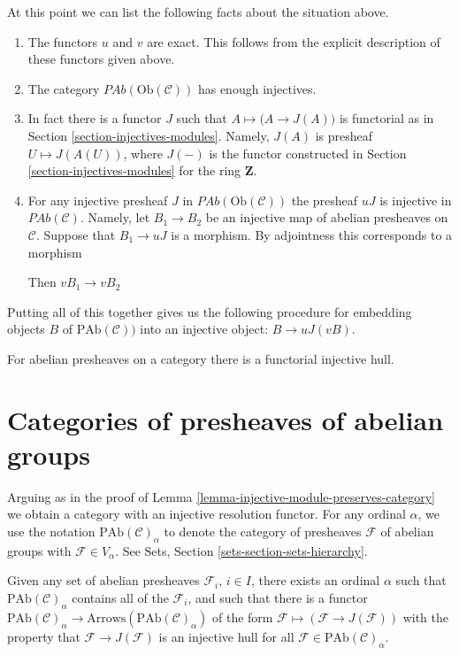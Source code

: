 \medskip\noindent
At this point we can list the following facts
about the situation above.
\begin{enumerate}
\item The functors $u$ and $v$ are exact. This follows from
the explicit description of these functors given above.
\item The category $\textit{PAb}(\text{Ob}(\mathcal{C}))$
has enough injectives.
\item In fact there is a functor $J$ such that
$A \mapsto \big(A \to J(A)\big)$ is functorial as in
Section \ref{section-injectives-modules}.
Namely, $J(A)$ is presheaf $U\mapsto J(A(U))$, where
$J(-)$ is the functor constructed in
Section \ref{section-injectives-modules} for the ring $\mathbf{Z}$.
\item For any injective presheaf $J$ in $\textit{PAb}(\text{Ob}(\mathcal{C}))$
the presheaf $uJ$ is injective in $\textit{PAb}(\mathcal{C})$.
Namely, let $B_1 \to B_2$ be an injective map of abelian
presheaves on $\mathcal{C}$. Suppose that $B_1 \to uJ$ is
a morphism. By adjointness this corresponds to a morphism

Then $vB_1 \to vB_2$
\end{enumerate}

\medskip\noindent
Putting all of this together gives us the following procedure
for embedding objects $B$ of $\text{PAb}(\mathcal{C}))$ into
an injective object: $B \to uJ(vB)$.

\begin{proposition}
\label{proposition-presheaves-injectives}
For abelian presheaves on a category there is a functorial injective hull.
\end{proposition}

\section{Categories of presheaves of abelian groups}
\label{section-category-presheaves}

\noindent
Arguing as in the proof of
Lemma \ref{lemma-injective-module-preserves-category} we obtain a category
with an injective resolution functor. For any ordinal $\alpha$,
we use the notation $\text{PAb}(\mathcal{C})_\alpha$ to denote the category
of presheaves $\mathcal{F}$ of abelian groups with $\mathcal{F} \in V_\alpha$.
See Sets, Section \ref{sets-section-sets-hierarchy}.

\begin{lemma} 
\label{lemma-injective-presheaf-preserves-category}
Given any set of abelian presheaves $\mathcal{F}_i$, $i\in I$, there
exists an ordinal $\alpha$ such that $\text{PAb}(\mathcal{C})_\alpha$
contains all of the $\mathcal{F}_i$, and such that there is a functor
$\text{PAb}(\mathcal{C})_\alpha \to
\text{Arrows}(\text{PAb}(\mathcal{C})_\alpha)$
of the form $\mathcal{F} \mapsto (\mathcal{F} \to J(\mathcal{F}))$
with the property that $\mathcal{F} \to J(\mathcal{F})$ is an injective
hull for all $\mathcal{F} \in \text{PAb}(\mathcal{C})_\alpha$.
\end{lemma}

